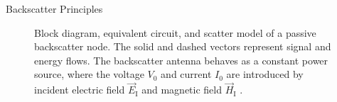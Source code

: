 \documentclass[journal]{IEEEtran}
\begin{document}
\begin{section}{Backscatter Principles}

	\begin{figure}[!t]
		\centering
		\caption{Block diagram, equivalent circuit, and scatter model of a passive backscatter node. The solid and dashed vectors represent signal and energy flows. The backscatter antenna behaves as a constant power source, where the voltage $V_0$ and current $I_0$ are introduced by incident electric field $\vec{E}_{\mathrm{I}}$ and magnetic field $\vec{H}_{\mathrm{I}}$ \cite{Huang2021}.}
	\end{figure}


\end{section}
\end{document}

